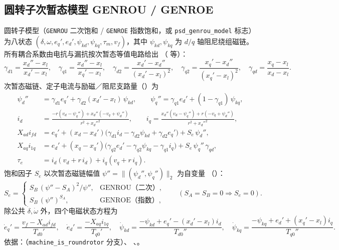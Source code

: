 \subsection{圆转子次暂态模型 GENROU / GENROE}
\label{sec:dynamics-machine-genrou}
圆转子模型（\texttt{GENROU} 二次饱和 / \texttt{GENROE} 指数饱和，或
\texttt{psd\_genrou\_model} 标志）为八状态
$(\delta,\omega,e_q',e_d',\psi_{kd},\psi_{kq},\tau_m,v_f)$，其中 $\psi_{kd},\psi_{kq}$ 为
$d/q$ 轴阻尼绕组磁链。所有耦合系数由电抗与漏抗按次暂态等值电路给出
（ 等）：
\begin{equation}
 \gamma_{d1}=\frac{x_d''-x_l}{x_d'-x_l},\quad
 \gamma_{q1}=\frac{x_d''-x_l}{x_q'-x_l},\quad
 \gamma_{d2}=\frac{x_d'-x_d''}{(x_d'-x_l)^2},\quad
 \gamma_{q2}=\frac{x_q'-x_d''}{(x_q'-x_l)^2},\quad
 \gamma_{qd}=\frac{x_q-x_l}{x_d-x_l}.
\end{equation}
次暂态磁链、定子电流与励磁／阻尼支路量（）为
\begin{align}
 \psi_d'' &= \gamma_{d1}e_q'+\gamma_{d2}(x_d'-x_l)\,\psi_{kd},\qquad
 \psi_q'' = \gamma_{q1}e_d'+(1-\gamma_{q1})\,\psi_{kq},\\
 i_d &= \frac{-r(v_d-\psi_q'')+x_d''(-v_q+\psi_d'')}{r^2+x_d''^2},\qquad
 i_q = \frac{x_d''(v_d-\psi_q'')+r(-v_q+\psi_d'')}{r^2+x_d''^2},\\
 X_{ad}i_{fd} &= e_q'+(x_d-x_d')\big(\gamma_{d1}i_d-\gamma_{d2}\psi_{kd}+\gamma_{d2}e_q'\big)
              +S_e\,\psi_d'',\\
 X_{aq}i_{1q} &= e_d'+(x_q-x_q')\big(\gamma_{q2}e_d'-\gamma_{q2}\psi_{kq}-\gamma_{q1}i_q\big)
              +S_e\,\psi_q''\,\gamma_{qd},\\
 \tau_e &= i_d(v_d+r\,i_d)+i_q(v_q+r\,i_q).
\end{align}
饱和因子 $S_e$ 以次暂态磁链幅值 $\psi''=\lVert(\psi_d'',\psi_q'')\rVert_2$ 为自变量
（）：
\begin{equation}
 S_e=\begin{cases} S_B\,(\psi''-S_A)^2/\psi'', & \text{GENROU（二次）},\\
                   S_B\,(\psi'')^{S_A}, & \text{GENROE（指数）},\end{cases}
 \qquad (S_A=S_B=0\Rightarrow S_e=0).
\end{equation}
除公共 $\dot\delta,\dot\omega$ 外，四个电磁状态方程为
\begin{equation}
 \dot e_q'=\frac{v_f-X_{ad}i_{fd}}{T_{d0}'},\quad
 \dot e_d'=\frac{-X_{aq}i_{1q}}{T_{q0}'},\quad
 \dot\psi_{kd}=\frac{-\psi_{kd}+e_q'-(x_d'-x_l)i_d}{T_{d0}''},\quad
 \dot\psi_{kq}=\frac{-\psi_{kq}+e_d'+(x_q'-x_l)i_q}{T_{q0}''}.
\end{equation}
依据：（\texttt{machine\_is\_roundrotor} 分支）、
、。

